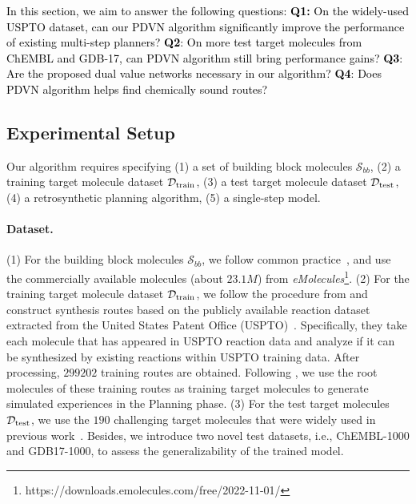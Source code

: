 \documentclass[nohyperref]{article}
\theoremstyle{plain}
\theoremstyle{definition}
\theoremstyle{remark}
\begin{document}
\textcolor{black}{In this section, we aim to answer the following questions: \textbf{Q1:} On the widely-used USPTO dataset, can our PDVN algorithm significantly improve the performance of existing multi-step planners?
\textbf{Q2}: On more test target molecules from ChEMBL and GDB-17, can PDVN algorithm still bring performance gains?
\textbf{Q3}: Are the proposed dual value networks necessary in our algorithm? 
\textbf{Q4}: 
Does PDVN algorithm helps find chemically sound routes?
}
\subsection{Experimental Setup}
Our algorithm requires specifying (1) a set of building block molecules $\mathcal{S}_{bb}$,
(2) a training target molecule dataset $\mathcal{D}_{\rm train}$,
(3) a test target molecule dataset $\mathcal{D}_{\rm test}$,
(4) a retrosynthetic planning algorithm, 
(5) a single-step model.

\paragraph{Dataset.}
(1) For the building block molecules $\mathcal{S}_{bb}$, we follow common practice~\cite{chen20retrostar}, and use the commercially available molecules (about $23.1M$) from \textit{eMolecules}\footnote{https://downloads.emolecules.com/free/2022-11-01/}.
(2) For the training target molecule dataset $\mathcal{D}_{\rm train}$, we follow the procedure from \cite{chen20retrostar, kim2021self} and construct synthesis routes based on the publicly available reaction dataset extracted from the United States Patent Office (USPTO)~\cite{lowe2012extraction}. 
Specifically, they take each molecule that has appeared in USPTO reaction data and analyze if it can be synthesized by existing reactions within USPTO training data. After processing, $299202$ training routes are obtained. 
Following \citep{kim2021self}, we use the root molecules of these training routes as training target molecules to generate simulated experiences in the Planning phase.
(3) For the test target molecules $\mathcal{D}_{\rm test}$, we use the $190$ challenging target molecules that were widely used in previous work~\cite{chen20retrostar, kim2021self, han2022gnn, xie2022retrograph, tripp2022reevaluating}.
Besides, we introduce two novel test datasets, i.e., ChEMBL-1000 and GDB17-1000, to assess the generalizability of the trained model.
\end{document}
